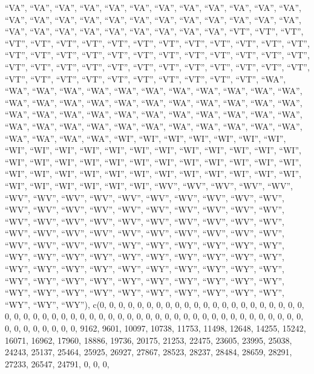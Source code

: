 \documentclass[
]{article}
\begin{document}
``VA'', ``VA'', ``VA'', ``VA'', ``VA'', ``VA'', ``VA'', ``VA'', ``VA'',
``VA'', ``VA'', ``VA'', ``VA'', ``VA'', ``VA'', ``VA'', ``VA'', ``VA'',
``VA'', ``VA'', ``VA'', ``VA'', ``VA'', ``VA'', ``VA'', ``VA'', ``VA'',
``VA'', ``VA'', ``VA'', ``VA'', ``VA'', ``VA'', ``VT'', ``VT'', ``VT'',
``VT'', ``VT'', ``VT'', ``VT'', ``VT'', ``VT'', ``VT'', ``VT'', ``VT'',
``VT'', ``VT'', ``VT'', ``VT'', ``VT'', ``VT'', ``VT'', ``VT'', ``VT'',
``VT'', ``VT'', ``VT'', ``VT'', ``VT'', ``VT'', ``VT'', ``VT'', ``VT'',
``VT'', ``VT'', ``VT'', ``VT'', ``VT'', ``VT'', ``VT'', ``VT'', ``VT'',
``VT'', ``VT'', ``VT'', ``VT'', ``VT'', ``VT'', ``VT'', ``VT'', ``VT'',
``VT'', ``WA'', ``WA'', ``WA'', ``WA'', ``WA'', ``WA'', ``WA'', ``WA'',
``WA'', ``WA'', ``WA'', ``WA'', ``WA'', ``WA'', ``WA'', ``WA'', ``WA'',
``WA'', ``WA'', ``WA'', ``WA'', ``WA'', ``WA'', ``WA'', ``WA'', ``WA'',
``WA'', ``WA'', ``WA'', ``WA'', ``WA'', ``WA'', ``WA'', ``WA'', ``WA'',
``WA'', ``WA'', ``WA'', ``WA'', ``WA'', ``WA'', ``WA'', ``WA'', ``WA'',
``WA'', ``WA'', ``WA'', ``WA'', ``WA'', ``WI'', ``WI'', ``WI'', ``WI'',
``WI'', ``WI'', ``WI'', ``WI'', ``WI'', ``WI'', ``WI'', ``WI'', ``WI'',
``WI'', ``WI'', ``WI'', ``WI'', ``WI'', ``WI'', ``WI'', ``WI'', ``WI'',
``WI'', ``WI'', ``WI'', ``WI'', ``WI'', ``WI'', ``WI'', ``WI'', ``WI'',
``WI'', ``WI'', ``WI'', ``WI'', ``WI'', ``WI'', ``WI'', ``WI'', ``WI'',
``WI'', ``WI'', ``WI'', ``WI'', ``WI'', ``WI'', ``WI'', ``WI'', ``WI'',
``WV'', ``WV'', ``WV'', ``WV'', ``WV'', ``WV'', ``WV'', ``WV'', ``WV'',
``WV'', ``WV'', ``WV'', ``WV'', ``WV'', ``WV'', ``WV'', ``WV'', ``WV'',
``WV'', ``WV'', ``WV'', ``WV'', ``WV'', ``WV'', ``WV'', ``WV'', ``WV'',
``WV'', ``WV'', ``WV'', ``WV'', ``WV'', ``WV'', ``WV'', ``WV'', ``WV'',
``WV'', ``WV'', ``WV'', ``WV'', ``WV'', ``WV'', ``WV'', ``WV'', ``WV'',
``WV'', ``WV'', ``WV'', ``WV'', ``WY'', ``WY'', ``WY'', ``WY'', ``WY'',
``WY'', ``WY'', ``WY'', ``WY'', ``WY'', ``WY'', ``WY'', ``WY'', ``WY'',
``WY'', ``WY'', ``WY'', ``WY'', ``WY'', ``WY'', ``WY'', ``WY'', ``WY'',
``WY'', ``WY'', ``WY'', ``WY'', ``WY'', ``WY'', ``WY'', ``WY'', ``WY'',
``WY'', ``WY'', ``WY'', ``WY'', ``WY'', ``WY'', ``WY'', ``WY'', ``WY'',
``WY'', ``WY'', ``WY'', ``WY'', ``WY'', ``WY'', ``WY'', ``WY''), c(0, 0,
0, 0, 0, 0, 0, 0, 0, 0, 0, 0, 0, 0, 0, 0, 0, 0, 0, 0, 0, 0, 0, 0, 0, 0,
0, 0, 0, 0, 0, 0, 0, 0, 0, 0, 0, 0, 0, 0, 0, 0, 0, 0, 0, 0, 0, 0, 0, 0,
0, 0, 0, 0, 0, 0, 0, 0, 0, 0, 0, 0, 9162, 9601, 10097, 10738, 11753,
11498, 12648, 14255, 15242, 16071, 16962, 17960, 18886, 19736, 20175,
21253, 22475, 23605, 23995, 25038, 24243, 25137, 25464, 25925, 26927,
27867, 28523, 28237, 28484, 28659, 28291, 27233, 26547, 24791, 0, 0, 0,
\end{document}
